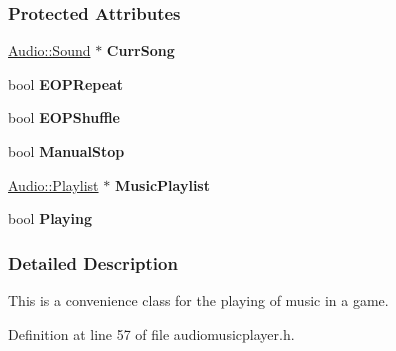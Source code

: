 \subsubsection*{Protected Attributes}
\begin{DoxyCompactItemize}
\item 
\hypertarget{classMezzanine_1_1Audio_1_1MusicPlayer_a686d0e56c8f112ddc2ce497d3345f4fc}{
\hyperlink{classMezzanine_1_1Audio_1_1Sound}{Audio::Sound} $\ast$ {\bfseries CurrSong}}
\label{classMezzanine_1_1Audio_1_1MusicPlayer_a686d0e56c8f112ddc2ce497d3345f4fc}

\item 
\hypertarget{classMezzanine_1_1Audio_1_1MusicPlayer_af7a95635f257d812cd85f3eed041cd3c}{
bool {\bfseries EOPRepeat}}
\label{classMezzanine_1_1Audio_1_1MusicPlayer_af7a95635f257d812cd85f3eed041cd3c}

\item 
\hypertarget{classMezzanine_1_1Audio_1_1MusicPlayer_a26a63239fad128d4f71fd393b58714f6}{
bool {\bfseries EOPShuffle}}
\label{classMezzanine_1_1Audio_1_1MusicPlayer_a26a63239fad128d4f71fd393b58714f6}

\item 
\hypertarget{classMezzanine_1_1Audio_1_1MusicPlayer_a15d7c02534b98da44db4fc5da8390234}{
bool {\bfseries ManualStop}}
\label{classMezzanine_1_1Audio_1_1MusicPlayer_a15d7c02534b98da44db4fc5da8390234}

\item 
\hypertarget{classMezzanine_1_1Audio_1_1MusicPlayer_a305f6af3262c26e93434aa49c54b9906}{
\hyperlink{classMezzanine_1_1Audio_1_1Playlist}{Audio::Playlist} $\ast$ {\bfseries MusicPlaylist}}
\label{classMezzanine_1_1Audio_1_1MusicPlayer_a305f6af3262c26e93434aa49c54b9906}

\item 
\hypertarget{classMezzanine_1_1Audio_1_1MusicPlayer_a43051ebab68f7a38112cd80925442ff1}{
bool {\bfseries Playing}}
\label{classMezzanine_1_1Audio_1_1MusicPlayer_a43051ebab68f7a38112cd80925442ff1}

\end{DoxyCompactItemize}


\subsubsection{Detailed Description}
This is a convenience class for the playing of music in a game. 

Definition at line 57 of file audiomusicplayer.h.



